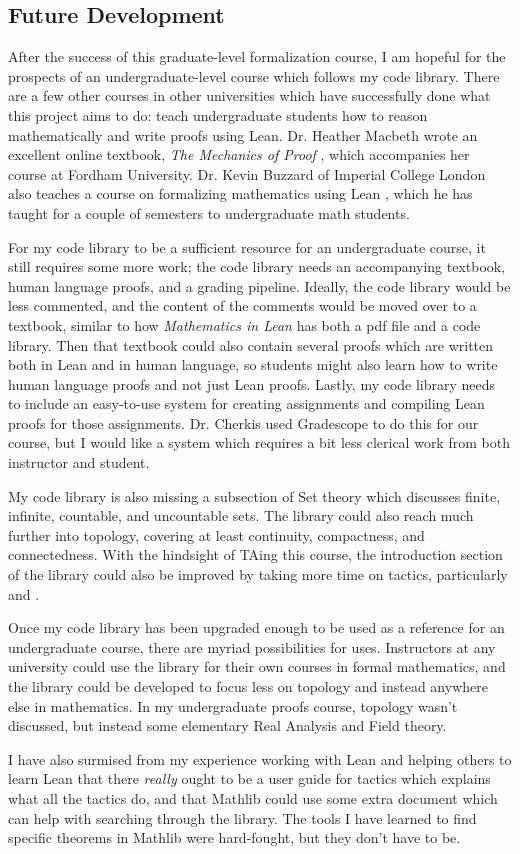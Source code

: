 \subsection{Future Development}

After the success of this graduate-level formalization course, I am
hopeful for the prospects of an undergraduate-level course which
follows my code library. There are a few other courses in other
universities which have successfully done what this project aims to do:
teach undergraduate students how to reason mathematically and write proofs
using Lean. Dr. Heather Macbeth wrote an excellent online textbook, 
\textit{The Mechanics of Proof} \cite{Macbeth}, 
which accompanies her course at Fordham University. 
Dr. Kevin Buzzard of Imperial College London also teaches a course on 
formalizing mathematics using Lean \cite{Buzzard}, 
which he has taught for a couple of 
semesters to undergraduate math students. 

For my code library to be a sufficient resource for an undergraduate course, 
it still requires some more work; the code library needs an accompanying 
textbook, human language proofs, and a grading pipeline. Ideally, the code
library would be less commented, and the content of the comments would be moved
over to a textbook, similar to how \textit{Mathematics in Lean} has both a pdf file
and a code library. Then that textbook could also contain several proofs which
are written both in Lean and in human language, so students might also
learn how to write human language proofs and not just Lean proofs. Lastly, 
my code library needs to include an easy-to-use system for creating assignments
and compiling Lean proofs for those assignments. Dr. Cherkis used Gradescope to
do this for our course, but I would like a system which requires a bit less clerical
work from both instructor and student.

My code library is also missing a subsection of Set theory which discusses
finite, infinite, countable, and uncountable sets. The library could also
reach much further into topology, covering at least continuity, compactness, and
connectedness. With the hindsight of TAing this course, the introduction section 
of the library could also be improved by taking more time on tactics, 
particularly  and .

Once my code library has been upgraded enough to be used as a reference for
an undergraduate course, there are myriad possibilities for uses.
Instructors at any university could use the library for their own courses
in formal mathematics, and the library could be developed to focus less on
topology and instead anywhere else in mathematics. In my undergraduate proofs
course, topology wasn't discussed, but instead some elementary Real Analysis and
Field theory. 

I have also surmised from my experience working with Lean and helping
others to learn Lean that there \textit{really} ought to be a user guide
for tactics which explains what all the tactics do, and that Mathlib could
use some extra document which can help with searching through the library. 
The tools I have learned to find specific theorems in Mathlib were hard-fought,
but they don't have to be.

